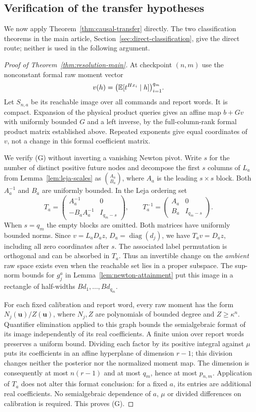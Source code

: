 \subsection{Verification of the transfer hypotheses}
\label{sec:transfer-application}
We now apply Theorem~\ref{thm:causal-transfer} directly. The two
classification theorems in the main article, Section~\ref{sec:direct-classification},
give the direct route; neither is used in the following argument.

\begin{proof}[Proof of Theorem~\ref{thm:resolution-main}]
At checkpoint $(n,m)$ use the nonconstant formal raw moment vector
\[
 v(h)=\bigl(\mathbb E[t^{Hx_i}\mid h]\bigr)_{i=1}^{q_m}.
\]
Let $S_{n,a}$ be its reachable image over all commands and report words.
It is compact. Expansion of the physical product queries gives an
affine map $b+Gv$ with uniformly bounded $G$ and a left inverse, by
the full-column-rank formal product matrix established above. Repeated
exponents give equal coordinates of $v$, not a change in this formal
coefficient matrix.

We verify (G) without inverting a vanishing Newton pivot. Write
$s$ for the number of distinct positive future nodes and decompose the
first $s$ columns of $L_a$ from Lemma~\ref{lem:leja-scales} as
$\binom{A_a}{B_a}$, where $A_a$ is the leading $s\times s$ block.
Both $A_a^{-1}$ and $B_a$ are uniformly bounded. In the Leja ordering set
\[
 T_a=\begin{pmatrix}
       A_a^{-1}&0\\-B_aA_a^{-1}&I_{q_m-s}
     \end{pmatrix},\qquad
 T_a^{-1}=\begin{pmatrix}A_a&0\\B_a&I_{q_m-s}\end{pmatrix}.
\]
When $s=q_m$ the empty blocks are omitted. Both matrices have uniformly
bounded norms. Since $v=L_aD_az$, $D_a=\operatorname{diag}(d_j)$,
we have $T_av=D_az$, including all zero coordinates after $s$.
The associated label permutation is orthogonal and can be absorbed in
$T_a$. Thus an invertible change on the \emph{ambient} raw space exists
even when the reachable set lies in a proper subspace. The sup-norm
bounds for $g_j^a$ in Lemma~\ref{lem:newton-attainment} put this image
in a rectangle of half-widths $B d_1,\ldots,B d_{q_m}$.

For each fixed calibration and report word, every raw moment has the
form $N_j(\boldsymbol u)/Z(\boldsymbol u)$, where $N_j,Z$ are
polynomials of bounded degree and $Z\ge\kappa^n$. Quantifier
elimination applied to this graph bounds the semialgebraic format of
its image independently of its real coefficients. A finite union over
report words preserves a uniform bound. Dividing each factor by its
positive integral against $\mu$ puts its coefficients in an affine
hyperplane of dimension $r-1$; this division changes neither the
posterior nor the normalized moment map. The dimension is consequently
at most $n(r-1)$ and at most $q_m$, hence at most $p_{n,m}$.
Application of $T_a$ does not alter this format conclusion: for a fixed
$a$, its entries are additional real coefficients. No semialgebraic
dependence of $a$, $\mu$ or divided differences on calibration is
required. This proves (G).


\end{proof}
